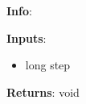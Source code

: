 \textbf{Info}:

\noindent \textbf{Inputs}:
\begin{itemize}
\item{long step}
\end{itemize}

\noindent \textbf{Returns}: void
